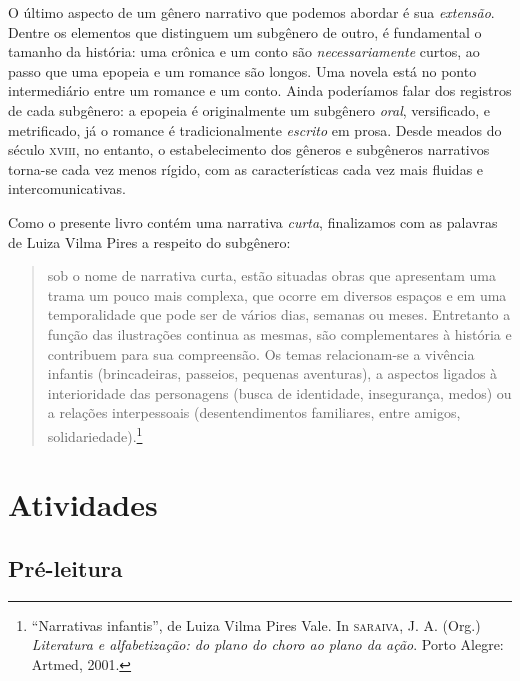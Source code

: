 \documentclass[11pt]{extarticle}
\begin{document}
O último aspecto de um gênero narrativo que podemos abordar é sua 
\textit{extensão}. Dentre os elementos que distinguem um subgênero 
de outro, é fundamental o tamanho da história: uma crônica e um conto são \textit{necessariamente}
curtos, ao passo que uma epopeia e um romance são longos. Uma novela
está no ponto intermediário entre um romance e um conto.
Ainda poderíamos falar dos registros de cada subgênero: 
a epopeia é originalmente um subgênero \textit{oral}, versificado, e metrificado,
já o romance é tradicionalmente \textit{escrito} em prosa. 
Desde meados do século \textsc{xviii}, no entanto, o estabelecimento
dos gêneros e subgêneros narrativos torna-se cada vez menos rígido,
com as características cada vez mais fluidas e intercomunicativas.

Como o presente livro contém uma narrativa \textit{curta},
finalizamos com as palavras de Luiza Vilma Pires a respeito do
subgênero:

\begin{quote}
sob o nome de narrativa curta, estão situadas obras que apresentam uma trama 
um pouco mais complexa, que ocorre em diversos espaços e em uma temporalidade 
que pode ser de vários dias, semanas ou meses. Entretanto a função das ilustrações 
continua as mesmas, são complementares à história e contribuem para sua compreensão. 
Os temas relacionam-se a vivência infantis (brincadeiras, passeios, pequenas aventuras), 
a aspectos ligados à interioridade das personagens (busca de identidade, insegurança, 
medos) ou a relações interpessoais (desentendimentos familiares, entre amigos, solidariedade).\footnote{“Narrativas infantis”, de Luiza Vilma Pires Vale. In \textsc{saraiva}, J. A. (Org.) \textit{Literatura e alfabetização: do plano do choro ao plano da ação}. Porto Alegre: Artmed, 2001.} 
\end{quote} 

\section{Atividades}

\subsection{Pré-leitura}

\end{document}
